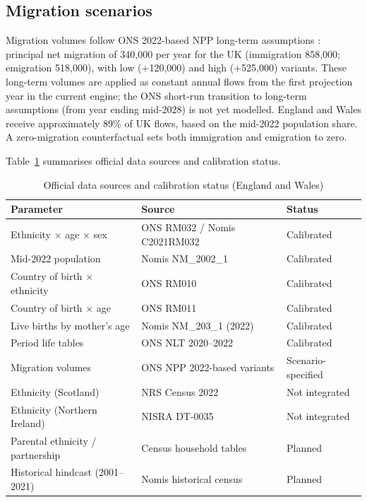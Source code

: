 \documentclass[12pt,a4paper]{article}
\begin{document}
\subsection{Migration scenarios}

Migration volumes follow ONS 2022-based NPP long-term assumptions
\citep{ons2024nppmigration}: principal net migration of 340,000 per year for the UK
(immigration 858,000; emigration 518,000), with low (+120,000) and high (+525,000) variants.
These long-term volumes are applied as constant annual flows from the first projection year
in the current engine; the ONS short-run transition to long-term assumptions (from year
ending mid-2028) is not yet modelled. England and Wales receive approximately 89\% of UK
flows, based on the mid-2022 population share. A zero-migration counterfactual sets both
immigration and emigration to zero.

Table~\ref{tab:data} summarises official data sources and calibration status.

\begin{table}[H]
\centering
\caption{Official data sources and calibration status (England and Wales)}
\label{tab:data}
\begin{tabular}{lll}
\toprule
\textbf{Parameter} & \textbf{Source} & \textbf{Status} \\
\midrule
Ethnicity $\times$ age $\times$ sex & ONS RM032 / Nomis C2021RM032 & Calibrated \\
Mid-2022 population & Nomis NM\_2002\_1 & Calibrated \\
Country of birth $\times$ ethnicity & ONS RM010 & Calibrated \\
Country of birth $\times$ age & ONS RM011 & Calibrated \\
Live births by mother's age & Nomis NM\_203\_1 (2022) & Calibrated \\
Period life tables & ONS NLT 2020--2022 & Calibrated \\
Migration volumes & ONS NPP 2022-based variants & Scenario-specified \\
Ethnicity (Scotland) & NRS Census 2022 & Not integrated \\
Ethnicity (Northern Ireland) & NISRA DT-0035 & Not integrated \\
Parental ethnicity / partnership & Census household tables & Planned \\
Historical hindcast (2001--2021) & Nomis historical census & Planned \\
\bottomrule
\end{tabular}
\end{table}
\end{document}
